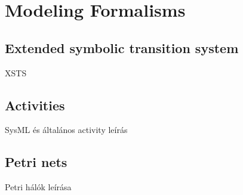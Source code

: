 \section{Modeling Formalisms}

\subsection{Extended symbolic transition system}

XSTS

\subsection{Activities}

SysML és általános activity leírás

\subsection{Petri nets}

Petri hálók leírása

